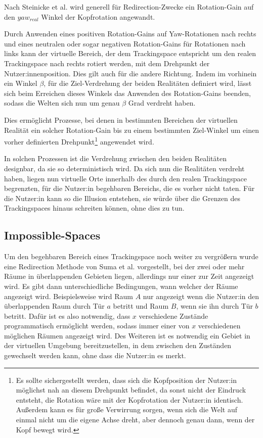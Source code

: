 Nach Steinicke et al. \cite{detection-thresholds} wird generell für Redirection-Zwecke ein Rotation-Gain auf den $yaw_{real}$ Winkel der Kopfrotation angewandt.

Durch Anwenden eines positiven Rotation-Gains auf Yaw-Rotationen nach rechts und eines neutralen oder sogar negativen Rotation-Gains für Rotationen nach links kann der virtuelle Bereich, der dem Trackingspace entspricht um den realen Trackingspace nach rechts rotiert werden, mit dem Drehpunkt der Nutzer:innenposition. Dies gilt auch für die andere Richtung. Indem im vorhinein ein Winkel $\beta$, für die Ziel-Verdrehung der beiden Realitäten definiert wird, lässt sich beim Erreichen dieses Winkels das Anwenden des Rotation-Gains beenden, sodass die Welten sich nun um genau $\beta$ Grad verdreht haben.

Dies ermöglicht Prozesse, bei denen in bestimmten Bereichen der virtuellen Realität ein solcher  Rotation-Gain bis zu einem bestimmten Ziel-Winkel um einen vorher definierten Drehpunkt\footnote{Es sollte sichergestellt werden, dass sich die Kopfposition der Nutzer:in möglichst nah an diesem Drehpunkt befindet, da sonst nicht der Eindruck entsteht, die Rotation wäre mit der Kopfrotation der Nutzer:in identisch. Außerdem kann es für große Verwirrung sorgen, wenn sich die Welt auf einmal nicht um die eigene Achse dreht, aber dennoch genau dann, wenn der Kopf bewegt wird.} angewendet wird.

In solchen Prozessen ist die Verdrehung zwischen den beiden Realitäten designbar, da sie so deterministisch wird. Da sich nun die Realitäten verdreht haben, liegen nun virtuelle Orte innerhalb des durch den realen Trackingspace begrenzten, für die Nutzer:in begehbaren Bereichs, die es vorher nicht taten.
Für die Nutzer:in kann so die Illusion entstehen, sie würde über die Grenzen des Trackingspaces hinaus schreiten können, ohne dies zu tun.

\subsection{Impossible-Spaces}
Um den begehbaren Bereich eines Trackingspace noch weiter zu vergrößern wurde eine Redirection Methode von Suma et al. \cite{impossible-spaces-suma} vorgestellt, bei der zwei oder mehr Räume in überlappenden Gebieten liegen, allerdings nur einer zur Zeit angezeigt wird. Es gibt dann unterschiedliche Bedingungen, wann welcher der Räume angezeigt wird. Beispielsweise wird Raum $A$ nur angezeigt wenn die Nutzer:in den überlappenden Raum durch Tür $a$ betritt und Raum $B$, wenn sie ihn durch Tür $b$ betritt.
Dafür ist es also notwendig, dass $x$ verschiedene Zustände programmatisch ermöglicht werden, sodass immer einer von $x$ verschiedenen möglichen Räumen angezeigt wird.
Des Weiteren ist es notwendig ein Gebiet in der virtuellen Umgebung bereitzustellen, in dem zwischen den Zuständen gewechselt werden kann, ohne dass die Nutzer:in es merkt.


